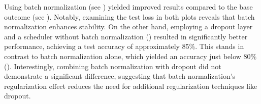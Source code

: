 Using batch normalization (see ) yielded improved results compared to the base outcome (see ). Notably, examining the test loss in both plots reveals that batch normalization enhances stability. On the other hand, employing a dropout layer and a scheduler without batch normalization () resulted in significantly better performance, achieving a test accuracy of approximately 85\%. This stands in contrast to batch normalization alone, which yielded an accuracy just below 80\% (). Interestingly, combining batch normalization with dropout did not demonstrate a significant difference, suggesting that batch normalization's regularization effect reduces the need for additional regularization techniques like dropout.





